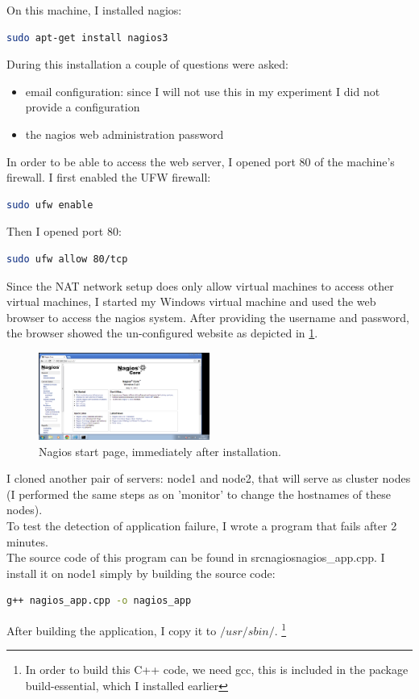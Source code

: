 \documentclass[12pt]{report}
\begin{document}
On this machine, I installed nagios:
\begin{lstlisting}[language=bash]
 sudo apt-get install nagios3
\end{lstlisting}
During this installation a couple of questions were asked:
\begin{itemize}
\item email configuration: since I will not use this in my experiment
  I did not provide a configuration 
\item the nagios web administration password
\end{itemize}
In order to be able to access the web server, I opened port 80 of the
machine's firewall. 
I first enabled the UFW firewall:
\begin{lstlisting}[language=bash]
  sudo ufw enable
\end{lstlisting} 
Then I opened port 80:
\begin{lstlisting}[language=bash]
  sudo ufw allow 80/tcp
\end{lstlisting} 
Since the NAT network setup does only allow virtual machines to access
other virtual machines, I started my Windows virtual machine and used
the web browser to access the nagios system. After providing the
username and password, the browser showed the un-configured website as
depicted in \cref{fig:nagios_1}.

\begin{figure}[h!]
  \caption{Nagios start page, immediately after installation.}
  \label{fig:nagios_1}
  \centering
    \includegraphics[width=0.5\textwidth]{pics/nagios_1.png}
\end{figure}

I cloned another pair of servers: node1 and node2, that will serve as
cluster nodes (I performed the same steps as on 'monitor' to change
the hostnames of these nodes).\\

To test the detection of application failure, I wrote a program that
fails after 2 minutes. \\

The source code of this program can be found in src\/nagios\/nagios\_app.cpp.
I install it on node1 simply by building the source code:
\begin{lstlisting}[language=bash]
  g++ nagios_app.cpp -o nagios_app 
\end{lstlisting} 
After building the application, I copy it to $/usr/sbin/$.
\footnote{In order to build this C++ code, we need gcc, this is included
in the package build-essential, which I installed earlier}
\end{document}

